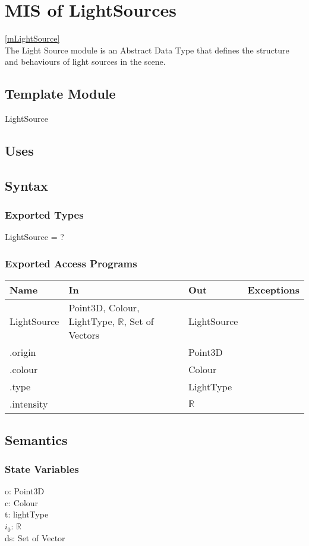 \documentclass[12pt, titlepage]{article}
\begin{document}
\newpage

\section{MIS of LightSources} \ref{mLightSource} \\
The Light Source module is an Abstract Data Type that defines the structure and 
behaviours of light sources in the scene.
\subsection{Template Module}
LightSource

\subsection{Uses}

\subsection{Syntax}
\subsubsection{Exported Types}
LightSource = ?

\subsubsection{Exported Access Programs}
\begin{center}
	\begin{tabular}{p{2cm} p{7cm} p{2cm} p{2cm}}
		\hline
		\textbf{Name} & \textbf{In} & \textbf{Out} & \textbf{Exceptions} \\
		\hline
		LightSource & Point3D, Colour, LightType, $\mathbb{R}$, Set of Vectors 
		& 
		LightSource & \\
		.origin & & Point3D & \\
		.colour & & Colour & \\
		.type & & LightType & \\
		.intensity & & $\mathbb{R}$ & \\
		\hline
	\end{tabular}
\end{center}

\subsection{Semantics}
\subsubsection{State Variables}
o: Point3D \\ %
c: Colour \\
t: lightType \\
$i_{0}$: $\mathbb{R}$ \\
ds: Set of Vector \\ %
\end{document}
